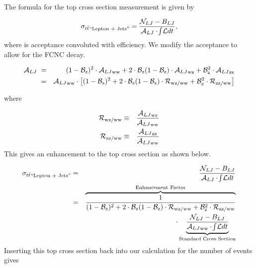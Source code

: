 The formula for the top cross section measurement is given by

\begin{displaymath}
{\tt}_\textrm{``Lepton + Jets''} =
  \frac {{\mathcal N}_{LJ} - B_{LJ}}{{\mathcal A}_{LJ} \cdot \lum},
\end{displaymath}
where \alj{~} is acceptance convoluted with efficiency.
We modify the acceptance to allow for the FCNC decay.

\begin{eqnarray*}
\alj{~}&=& (1-\betaz)^2\cdot\alj{ww} + 2\cdot\betaz(1-\betaz)\cdot\alj{wz}
+ \betaz^2\cdot\alj{zz}\\
&=& \alj{ww} \cdot \left[(1-\betaz)^2 + 2\cdot\betaz(1-\betaz)\cdot\rlj{wz}
+ \betaz^2\cdot\rlj{zz}\right]\\
\end{eqnarray*}

where

\begin{eqnarray*}
\rlj{wz}&\equiv&\frac{\alj{wz}}{\alj{ww}}\\
\rlj{zz}&\equiv&\frac{\alj{zz}}{\alj{ww}}\\
\end{eqnarray*}
This gives an enhancement to the top cross section as shown below.

\begin{eqnarray*}
{\tt}_\textrm{``Lepton + Jets''}
  & = &   \frac {{\mathcal N}_{LJ} - B_{LJ}}
{{\mathcal A}_{LJ} \cdot \lum} \\
  & = & \overbrace{\frac{1}
{(1-\betaz)^2 + 2\cdot\betaz(1-\betaz)\cdot\rlj{wz} + \betaz^2 \cdot
\rlj{zz}}}^
\textrm{Enhancement Factor}\\
& &{\bf \cdot} \underbrace{\frac {{\mathcal N}_{LJ} - B_{LJ}}
{\alj{ww} \cdot \lum}}_\textrm{Standard Cross Section} \\
\end{eqnarray*}
Inserting this top cross section back into our calculation for the
number of events gives

